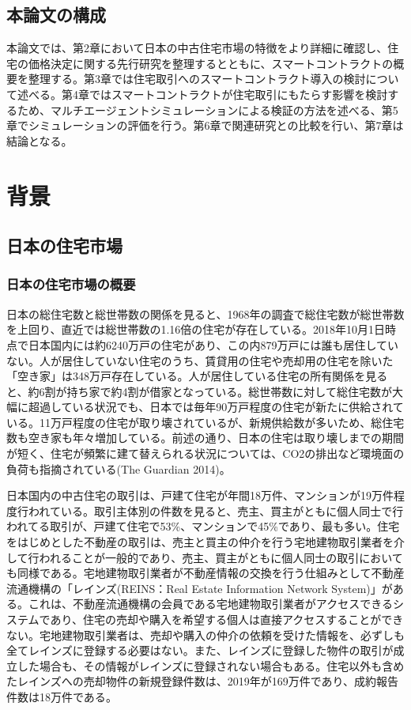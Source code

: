 \documentclass[a4paper,fontsize=11pt,report,notitlepage,line_length=38zw,number_of_lines=40,dvipdfmx]{jlreq}
\begin{document}
\section{本論文の構成}
本論文では、第2章において日本の中古住宅市場の特徴をより詳細に確認し、住宅の価格決定に関する先行研究を整理するとともに、スマートコントラクトの概要を整理する。第3章では住宅取引へのスマートコントラクト導入の検討について述べる。第4章ではスマートコントラクトが住宅取引にもたらす影響を検討するため、マルチエージェントシミュレーションによる検証の方法を述べる、第5章でシミュレーションの評価を行う。第6章で関連研究との比較を行い、第7章は結論となる。


\chapter{背景}
\section{日本の住宅市場}
\subsection{日本の住宅市場の概要}
日本の総住宅数と総世帯数の関係を見ると、1968年の調査で総住宅数が総世帯数を上回り、直近では総世帯数の1.16倍の住宅が存在している。2018年10月1日時点で日本国内には約6240万戸の住宅があり、この内879万戸には誰も居住していない。人が居住していない住宅のうち、賃貸用の住宅や売却用の住宅を除いた「空き家」は348万戸存在している\cite{tochitokei}。人が居住している住宅の所有関係を見ると、約6割が持ち家で約4割が借家となっている。総世帯数に対して総住宅数が大幅に超過している状況でも、日本では毎年90万戸程度の住宅が新たに供給されている\cite{kenchikuchakkou}。11万戸程度の住宅が取り壊されているが、新規供給数が多いため、総住宅数も空き家も年々増加している。前述の通り、日本の住宅は取り壊しまでの期間が短く、住宅が頻繁に建て替えられる状況については、CO2の排出など環境面の負荷も指摘されている(The Guardian 2014)\cite{guardian}。

日本国内の中古住宅の取引は、戸建て住宅が年間18万件、マンションが19万件程度行われている。取引主体別の件数を見ると、売主、買主がともに個人同士で行われてる取引が、戸建て住宅で53\%、マンションで45\%であり、最も多い\cite{fudosantorihiki}。住宅をはじめとした不動産の取引は、売主と買主の仲介を行う宅地建物取引業者を介して行われることが一般的であり、売主、買主がともに個人同士の取引においても同様である。宅地建物取引業者が不動産情報の交換を行う仕組みとして不動産流通機構の「レインズ(REINS：Real Estate Information Network System)」がある。これは、不動産流通機構の会員である宅地建物取引業者がアクセスできるシステムであり、住宅の売却や購入を希望する個人は直接アクセスすることができない。宅地建物取引業者は、売却や購入の仲介の依頼を受けた情報を、必ずしも全てレインズに登録する必要はない。また、レインズに登録した物件の取引が成立した場合も、その情報がレインズに登録されない場合もある\cite{fudosanjoho}。住宅以外も含めたレインズへの売却物件の新規登録件数は、2019年が169万件であり、成約報告件数は18万件である\cite{shiteiryutsu}。
\end{document}
